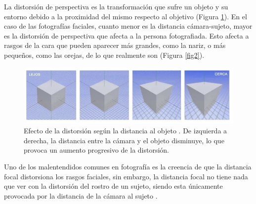 La distorsión de perspectiva \cite{8,51} es la transformación que sufre un objeto y su entorno debido a la proximidad del mismo respecto al objetivo (Figura \ref{fig15}). En el caso de las fotografías faciales, cuanto menor es la distancia cámara-sujeto, mayor es la distorsión de perspectiva que afecta a la persona fotografiada. Esto afecta a rasgos de la cara que pueden aparecer más grandes, como la nariz, o más pequeños, como las orejas, de lo que realmente son (Figura \ref{fig2}).

\begin{figure}[h]
	\centering
	\includegraphics[scale=0.5]{imagenes/cap2/distorsion.png}
	\caption[Efectos de la distorsión según distancia.]{Efecto de la distorsión según la distancia al objeto \cite{51}. De izquierda a derecha, la distancia entre la cámara y el objeto disminuye, lo que provoca un aumento progresivo de la distorsión.}
	\label{fig15}
\end{figure}

Uno de los malentendidos comunes en fotografía es la creencia de que la distancia focal distorsiona los rasgos faciales, sin embargo, la distancia focal no tiene nada que ver con la distorsión del rostro de un sujeto, siendo esta únicamente provocada por la distancia de la cámara al sujeto \cite{52}.